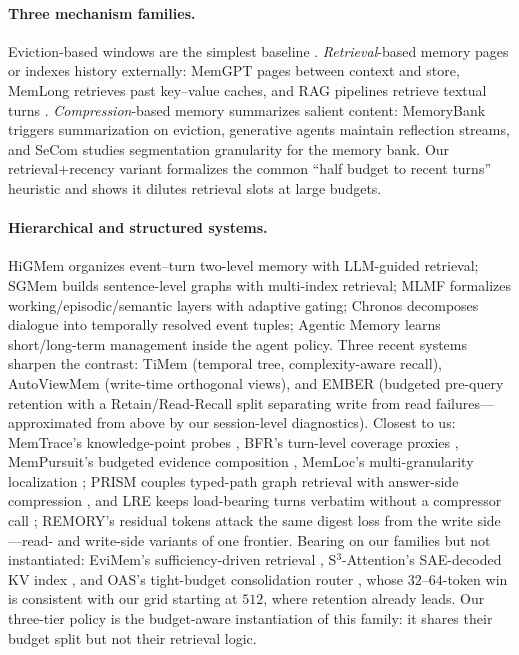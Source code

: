 \documentclass{article} %
\begin{document}
\paragraph{Three mechanism families.} Eviction-based windows are the simplest baseline
\citep{zhang2024survey}. \emph{Retrieval}-based memory pages or indexes history
externally: MemGPT \citep{packer2023memgpt} pages between context and store, MemLong
\citep{liu2024memlong} retrieves past key--value caches, and RAG pipelines retrieve
textual turns \citep{lewis2020retrieval,karpukhin2020dense}. \emph{Compression}-based
memory summarizes salient content: MemoryBank \citep{wu2024memorybank} triggers
summarization on eviction, generative agents \citep{park2023generative} maintain
reflection streams, and SeCom \citep{pan2025secom} studies segmentation granularity for
the memory bank. Our retrieval+recency variant formalizes the common ``half budget to
recent turns'' heuristic and shows it dilutes retrieval slots at large budgets.

\paragraph{Hierarchical and structured systems.} HiGMem \citep{cao2026higmem} organizes
event--turn two-level memory with LLM-guided retrieval; SGMem \citep{wu2025sgmem} builds
sentence-level graphs with multi-index retrieval; MLMF \citep{mlmf2026} formalizes
working/episodic/semantic layers with adaptive gating; Chronos \citep{chronos2026}
decomposes dialogue into temporally resolved event tuples; Agentic Memory
\citep{agemem2026} learns short/long-term management inside the agent policy. Three
recent systems sharpen the contrast: TiMem \citep{li2026timem} (temporal tree,
complexity-aware recall), AutoViewMem \citep{cao2026autoviewmem} (write-time orthogonal
views), and EMBER \citep{li2026ember} (budgeted pre-query retention with a
Retain/Read-Recall split separating write from read failures---approximated from above by
our session-level diagnostics). Closest to us: MemTrace's knowledge-point probes \citep{tang2026memtrace}, BFR's
turn-level coverage proxies \citep{li2026bfr}, MemPursuit's budgeted evidence composition
\citep{feng2026mempursuit}, MemLoc's multi-granularity localization \citep{wang2026memloc};
PRISM couples typed-path graph retrieval with answer-side compression \citep{peng2026prism},
and LRE keeps load-bearing turns verbatim without a compressor call \citep{lia2026lre};
REMORY's residual tokens \citep{xia2026remory} attack the same digest loss from the write
side---read- and write-side variants of one frontier.
Bearing on our families but not instantiated: EviMem's sufficiency-driven retrieval
\citep{li2026evimem}, S$^3$-Attention's SAE-decoded KV index \citep{ma2026s3attention}, and
OAS's tight-budget consolidation router \citep{kang2026oas}, whose $32$--$64$-token win is
consistent with our grid starting at $512$, where retention already leads. Our three-tier
policy is the budget-aware instantiation of this family: it shares their budget split but not
their retrieval logic.
\end{document}
